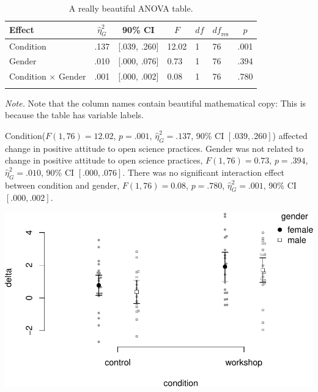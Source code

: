 \documentclass[
  man]{apa6}
\begin{document}
\begin{table}[tbp]

\begin{center}
\begin{threeparttable}

\caption{\label{tab:anova-example}A really beautiful ANOVA table.}

\begin{tabular}{lllllll}
\toprule
Effect & \multicolumn{1}{c}{$\hat{\eta}^2_G$} & \multicolumn{1}{c}{90\% CI} & \multicolumn{1}{c}{$F$} & \multicolumn{1}{c}{$\mathit{df}$} & \multicolumn{1}{c}{$\mathit{df}_{\mathrm{res}}$} & \multicolumn{1}{c}{$p$}\\
\midrule
Condition & .137 & {}[.039, .260] & 12.02 & 1 & 76 & .001\\
Gender & .010 & {}[.000, .076] & 0.73 & 1 & 76 & .394\\
Condition $\times$ Gender & .001 & {}[.000, .002] & 0.08 & 1 & 76 & .780\\
\bottomrule
\addlinespace
\end{tabular}

\begin{tablenotes}[para]
\normalsize{\textit{Note.} Note that the column names contain beautiful mathematical copy: This is because the table has variable labels.}
\end{tablenotes}

\end{threeparttable}
\end{center}

\end{table}

Condition(\(F(1, 76) = 12.02\), \(p = .001\), \(\hat{\eta}^2_G = .137\), 90\% CI \([.039, .260]\)) affected change in positive attitude to open science practices.
Gender was not related to change in positive attitude to open science practices, \(F(1, 76) = 0.73\), \(p = .394\), \(\hat{\eta}^2_G = .010\), 90\% CI \([.000, .076]\).
There was no significant interaction effect between condition and gender, \(F(1, 76) = 0.08\), \(p = .780\), \(\hat{\eta}^2_G = .001\), 90\% CI \([.000, .002]\).

\includegraphics{manuscript_files/figure-latex/beeplot-1.pdf}
\end{document}
